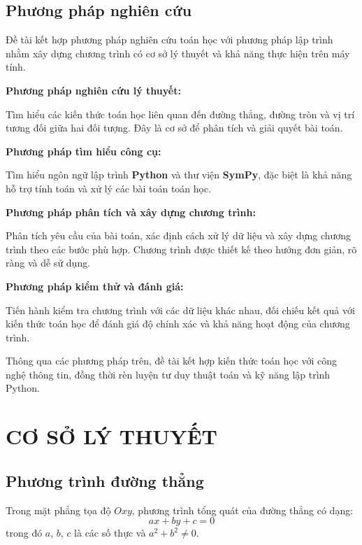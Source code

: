 \documentclass[12pt,a4paper]{article}
\begin{document}
\subsection{Phương pháp nghiên cứu}

Đề tài kết hợp phương pháp nghiên cứu toán học với phương pháp lập trình nhằm xây dựng
chương trình có cơ sở lý thuyết và khả năng thực hiện trên máy tính.

\textbf{ Phương pháp nghiên cứu lý thuyết:}

Tìm hiểu các kiến thức toán học liên quan đến đường thẳng, đường tròn và vị trí tương đối
giữa hai đối tượng. Đây là cơ sở để phân tích và giải quyết bài toán.

\textbf{ Phương pháp tìm hiểu công cụ:}

Tìm hiểu ngôn ngữ lập trình \textbf{Python} và thư viện \textbf{SymPy}, đặc biệt là khả năng
hỗ trợ tính toán và xử lý các bài toán toán học.

\textbf{ Phương pháp phân tích và xây dựng chương trình:}

Phân tích yêu cầu của bài toán, xác định cách xử lý dữ liệu và xây dựng chương trình theo
các bước phù hợp. Chương trình được thiết kế theo hướng đơn giản, rõ ràng và dễ sử dụng.

\textbf{ Phương pháp kiểm thử và đánh giá:}

Tiến hành kiểm tra chương trình với các dữ liệu khác nhau, đối chiếu kết quả với kiến thức
toán học để đánh giá độ chính xác và khả năng hoạt động của chương trình.

Thông qua các phương pháp trên, đề tài kết hợp kiến thức toán học với công nghệ thông tin,
đồng thời rèn luyện tư duy thuật toán và kỹ năng lập trình Python.

\section{CƠ SỞ LÝ THUYẾT}

\subsection{Phương trình đường thẳng}

Trong mặt phẳng tọa độ $Oxy$, phương trình tổng quát của đường thẳng có dạng:
\[
ax + by + c = 0
\]
trong đó $a$, $b$, $c$ là các số thực và $a^2+b^2\neq0$.
\end{document}
